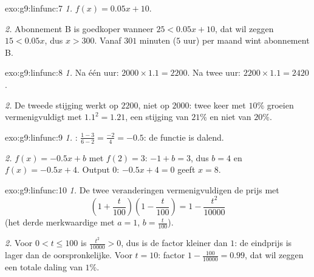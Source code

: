 \begin{solution}{exo:g9:linfunc:7}
\emph{1.} $f(x) = 0.05x + 10$.

\emph{2.} Abonnement B is goedkoper wanneer $25 < 0.05x + 10$, dat wil zeggen
$15 < 0.05x$, dus $x > 300$. Vanaf $301$ minuten ($5$ uur) per maand wint
abonnement B.
\end{solution}

\begin{solution}{exo:g9:linfunc:8}
\emph{1.} Na één uur: $2000 \times 1.1 = 2200$. Na twee uur:
$2200 \times 1.1 = 2420$.

\emph{2.} De tweede stijging werkt op $2200$, niet op $2000$: twee keer met $10\%$
groeien vermenigvuldigt met $1.1^2 = 1.21$, een stijging van $21\%$ en niet van
$20\%$.
\end{solution}

\begin{solution}{exo:g9:linfunc:9}
\emph{1.} : $\frac{1 - 3}{6 - 2} = \frac{-2}{4} = -0.5$: de
functie is dalend.

\emph{2.} $f(x) = -0.5x + b$ met $f(2) = 3$: $-1 + b = 3$, dus $b = 4$ en
$f(x) = -0.5x + 4$. Output $0$: $-0.5x + 4 = 0$ geeft $x = 8$.
\end{solution}

\begin{solution}{exo:g9:linfunc:10}
\emph{1.} De twee veranderingen vermenigvuldigen de prijs met
\[
\left(1 + \frac{t}{100}\right)\left(1 - \frac{t}{100}\right)
= 1 - \frac{t^2}{10000}
\]
(het derde merkwaardige  met $a = 1$, $b = \frac{t}{100}$).

\emph{2.} Voor $0 < t \leq 100$ is $\frac{t^2}{10000} > 0$, dus is de factor
kleiner dan $1$: de eindprijs is lager dan de oorspronkelijke. Voor $t = 10$:
factor $1 - \frac{100}{10000} = 0.99$, dat wil zeggen een totale daling van
$1\%$.
\end{solution}

